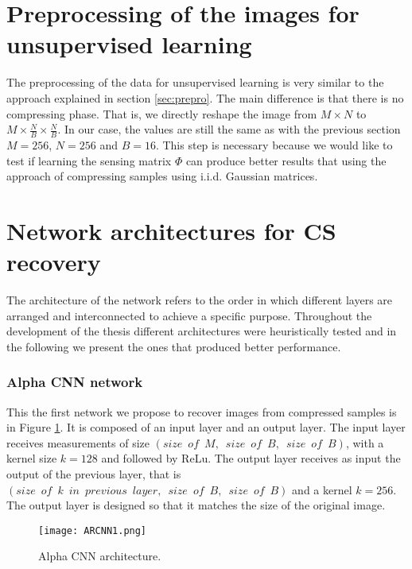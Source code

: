 \FloatBarrier

\section{Preprocessing of the images for unsupervised learning} \label{sec:preproun}
The preprocessing of the data for unsupervised learning is very similar to the approach explained in section \ref{sec:prepro}. The main difference is that there is no compressing phase. That is, we directly reshape the image from $M \times N$ to $M \times \frac{N}{B} \times \frac{N}{B}$. In our case, the values are still the same as with the previous section $M = 256$, $N = 256$ and $B = 16$. This step is necessary because we would like to test if learning the sensing matrix $\Phi$ can produce better results that using the approach of compressing samples using i.i.d. Gaussian matrices.    

\FloatBarrier

\section{Network architectures for CS recovery}
The architecture of the network refers to the order in which different layers are arranged and interconnected to achieve a specific purpose. Throughout the development of the thesis different architectures were heuristically tested and in the following we present the ones that produced better performance.

\FloatBarrier

\subsubsection{Alpha CNN network} \label{ch:alphaNet}
This the first network we propose to recover images from compressed samples is in Figure \ref{fig:ARCNNim1}. It is composed of an input layer and an output layer. The input layer receives measurements of size $(size \enspace of \enspace M ,\enspace size \enspace of \enspace B , \enspace size \enspace of \enspace B)$, with a kernel size $k=128$ and followed by ReLu. The output layer receives as input the output of the previous layer, that is $(size \enspace of \enspace k \enspace in \enspace previous \enspace layer ,\enspace size \enspace of \enspace B , \enspace size \enspace of \enspace B)$ and a kernel $k=256$. The output layer is designed so that it matches the size of the original image.  
\begin{figure}[!htb]
\centering 
\texttt{[image: ARCNN1.png]} 
\caption[Alpha CNN architecture for recovery ]{Alpha CNN architecture.}
\label{fig:ARCNNim1} 
\end{figure}

